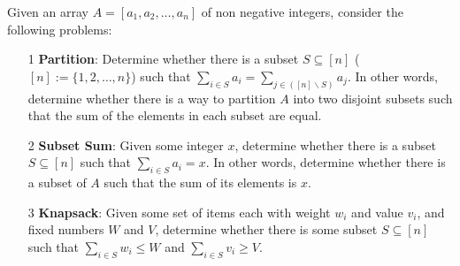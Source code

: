 \documentclass{article}
\begin{document}
Given an array $A = [a_{1}, a_{2}, \ldots, a_{n}]$ of non negative integers, consider the following problems:
    \begin{itemize}
        \item [1] \textbf{Partition}: Determine whether there is a subset $S \subseteq [n]$ ($[n] := \{1, 2, \ldots, n\}$) such that $\sum_{i \in S} a_{i} = \sum_{j \in ([n] \backslash S)}a_{j}$. In other words, determine whether there is a way to partition $A$ into two disjoint subsets such that the sum of the elements in each subset are equal.

        \item [2] \textbf{Subset Sum}: Given some integer $x$, determine whether there is a subset $S \subseteq [n]$ such that $\sum_{i \in S} a_{i} = x$. In other words, determine whether there is a subset of $A$ such that the sum of its elements is $x$.

        \item [3] \textbf{Knapsack}: Given some set of items each with weight $w_{i}$ and value $v_{i}$, and fixed numbers $W$ and $V$, determine whether there is some subset $S \subseteq [n]$ such that $\sum_{i \in S} w_{i} \leq W$ and $\sum_{i \in S} v_{i} \geq V$.
    \end{itemize}
\end{document}
